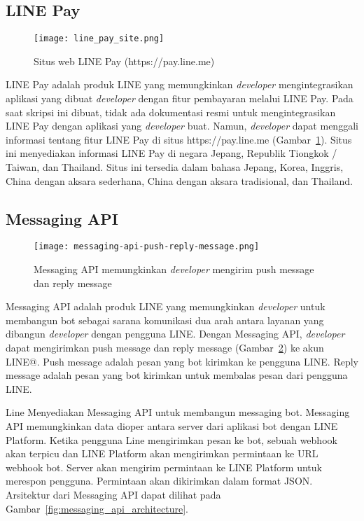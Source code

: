 \subsection{LINE Pay}
\begin{figure}[H]
	\centering  
	\texttt{[image: line\_pay\_site.png]}  
	\caption[Situs web LINE Pay]{Situs web LINE Pay (https://pay.line.me)} 
	\label{fig:line_pay_site} 
\end{figure}

LINE Pay adalah produk LINE yang memungkinkan \textit{developer} mengintegrasikan aplikasi yang dibuat \textit{developer} dengan fitur pembayaran melalui LINE Pay. Pada saat skripsi ini dibuat, tidak ada dokumentasi resmi untuk mengintegrasikan LINE Pay dengan aplikasi yang \textit{developer} buat. Namun, \textit{developer} dapat menggali informasi tentang fitur LINE Pay di situs https://pay.line.me (Gambar~\ref{fig:line_pay_site}). Situs ini menyediakan informasi LINE Pay di negara Jepang, Republik Tiongkok / Taiwan, dan Thailand. Situs ini tersedia dalam bahasa Jepang, Korea, Inggris, China dengan aksara sederhana, China dengan aksara tradisional, dan Thailand.

\subsection{Messaging API } 
\begin{figure}[H]
	\centering  
	\texttt{[image: messaging-api-push-reply-message.png]}  
	\caption[Push message dan reply message pada Messaging API]{Messaging API memungkinkan \textit{developer} mengirim push message dan reply message} 
	\label{fig:messaging-api-push-reply-message} 
\end{figure}

Messaging API adalah produk LINE yang memungkinkan \textit{developer} untuk membangun bot sebagai sarana komunikasi dua arah antara layanan yang dibangun \textit{developer} dengan pengguna LINE. Dengan Messaging API, \textit{developer} dapat mengirimkan push message dan reply message (Gambar~\ref{fig:messaging-api-push-reply-message}) ke akun LINE@. Push message adalah pesan yang bot kirimkan ke pengguna LINE. Reply message adalah pesan yang bot kirimkan untuk membalas pesan dari pengguna LINE.

Line Menyediakan Messaging API untuk membangun messaging bot. Messaging API memungkinkan data dioper antara server dari aplikasi bot dengan LINE Platform. Ketika pengguna Line mengirimkan pesan ke bot, sebuah webhook akan terpicu dan LINE Platform akan mengirimkan permintaan ke URL webhook bot. Server akan mengirim permintaan ke LINE Platform untuk merespon pengguna. Permintaan akan dikirimkan dalam format JSON. Arsitektur dari Messaging API dapat dilihat pada Gambar~\ref{fig:messaging_api_architecture}.

